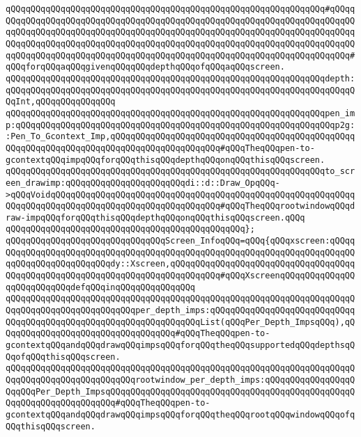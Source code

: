 \verb|qQQqqQQqqQQqqQQqqQQqqQQqqQQqqQQqqQQqqQQqqQQqqQQqqQQqqQQqqQQqqQQq#qQQqqQQqqQQqqQQqqQQqqQQqqQQqqQQqqQQqqQQqqQQqqQQqqQQqqQQqqQQqqQQqqQQqqQQqqQQqqQQqqQQqqQQqqQQqqQQqqQQqqQQqqQQqqQQqqQQqqQQqqQQqqQQqqQQqqQQqqQQqqQQqqQQqqQQqqQQqqQQqqQQqqQQqqQQqqQQqqQQqqQQqqQQqqQQqqQQqqQQqqQQqqQQqqQQqqQQqqQQqqQQqqQQqqQQqqQQqqQQqqQQqqQQqqQQqqQQqqQQqqQQqqQQqqQQqqQQqqQQqqQQq#qQQqforqQQqaqQQqgivenqQQqqQQqdepthqQQqofqQQqaqQQqscreen.|\newline
\verb|qQQqqQQqqQQqqQQqqQQqqQQqqQQqqQQqqQQqqQQqqQQqqQQqqQQqqQQqqQQqqQQqdepth:qQQqqQQqqQQqqQQqqQQqqQQqqQQqqQQqqQQqqQQqqQQqqQQqqQQqqQQqqQQqqQQqqQQqqQQqInt,qQQqqQQqqQQqqQQq|\newline
\verb|qQQqqQQqqQQqqQQqqQQqqQQqqQQqqQQqqQQqqQQqqQQqqQQqqQQqqQQqqQQqqQQqpen_imp:qQQqqQQqqQQqqQQqqQQqqQQqqQQqqQQqqQQqqQQqqQQqqQQqqQQqqQQqqQQqqQQqp2g::Pen_To_Gcontext_Imp,qQQqqQQqqQQqqQQqqQQqqQQqqQQqqQQqqQQqqQQqqQQqqQQqqQQqqQQqqQQqqQQqqQQqqQQqqQQqqQQqqQQqqQQqqQQq#qQQqTheqQQqpen-to-gcontextqQQqimpqQQqforqQQqthisqQQqdepthqQQqonqQQqthisqQQqscreen.|\newline
\verb|qQQqqQQqqQQqqQQqqQQqqQQqqQQqqQQqqQQqqQQqqQQqqQQqqQQqqQQqqQQqqQQqto_screen_drawimp:qQQqqQQqqQQqqQQqqQQqqQQqdi::d::Draw_OpqQQq->qQQqVoidqQQqqQQqqQQqqQQqqQQqqQQqqQQqqQQqqQQqqQQqqQQqqQQqqQQqqQQqqQQqqQQqqQQqqQQqqQQqqQQqqQQqqQQqqQQqqQQqqQQqqQQq#qQQqTheqQQqrootwindowqQQqdraw-impqQQqforqQQqthisqQQqdepthqQQqonqQQqthisqQQqscreen.qQQq|\newline
\verb|qQQqqQQqqQQqqQQqqQQqqQQqqQQqqQQqqQQqqQQqqQQqqQQq};|\newline
\newline
\verb|qQQqqQQqqQQqqQQqqQQqqQQqqQQqqQQqScreen_InfoqQQq=qQQq{qQQqxscreen:qQQqqQQqqQQqqQQqqQQqqQQqqQQqqQQqqQQqqQQqqQQqqQQqqQQqqQQqqQQqqQQqqQQqqQQqqQQqqQQqqQQqqQQqqQQqqQQqdy::Xscreen,qQQqqQQqqQQqqQQqqQQqqQQqqQQqqQQqqQQqqQQqqQQqqQQqqQQqqQQqqQQqqQQqqQQqqQQqqQQqqQQq#qQQqXscreenqQQqqQQqqQQqqQQqqQQqqQQqqQQqdefqQQqinqQQqqQQqqQQqqQQq|\newline
\verb|qQQqqQQqqQQqqQQqqQQqqQQqqQQqqQQqqQQqqQQqqQQqqQQqqQQqqQQqqQQqqQQqqQQqqQQqqQQqqQQqqQQqqQQqqQQqqQQqper_depth_imps:qQQqqQQqqQQqqQQqqQQqqQQqqQQqqQQqqQQqqQQqqQQqqQQqqQQqqQQqqQQqqQQqqQQqList(qQQqPer_Depth_ImpsqQQq),qQQqqQQqqQQqqQQqqQQqqQQqqQQqqQQqqQQq#qQQqTheqQQqpen-to-gcontextqQQqandqQQqdrawqQQqimpsqQQqforqQQqtheqQQqsupportedqQQqdepthsqQQqofqQQqthisqQQqscreen.|\newline
\verb|qQQqqQQqqQQqqQQqqQQqqQQqqQQqqQQqqQQqqQQqqQQqqQQqqQQqqQQqqQQqqQQqqQQqqQQqqQQqqQQqqQQqqQQqqQQqqQQqrootwindow_per_depth_imps:qQQqqQQqqQQqqQQqqQQqqQQqPer_Depth_ImpsqQQqqQQqqQQqqQQqqQQqqQQqqQQqqQQqqQQqqQQqqQQqqQQqqQQqqQQqqQQqqQQqqQQqqQQq#qQQqTheqQQqpen-to-gcontextqQQqandqQQqdrawqQQqimpsqQQqforqQQqtheqQQqrootqQQqwindowqQQqofqQQqthisqQQqscreen.|\newline
